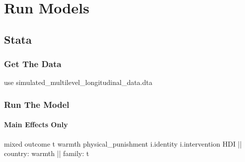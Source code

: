 \documentclass[
  letterpaper,
  DIV=11,
  numbers=noendperiod]{scrreprt}
\let\oldparagraph\paragraph
\renewcommand{\paragraph}[1]{\oldparagraph{#1}\mbox{}}
\newenvironment{Shaded}{\begin{snugshade}}{\end{snugshade}}
\newcommand{\KeywordTok}[1]{\textcolor[rgb]{0.00,0.23,0.31}{#1}}
\newcommand{\NormalTok}[1]{\textcolor[rgb]{0.00,0.23,0.31}{#1}}
\begin{document}
\section{Run Models}\label{run-models-2}

\subsection{Stata}

\subsubsection{Get The Data}\label{get-the-data-3}

\begin{Shaded}
\begin{Highlighting}[]

\KeywordTok{use}\NormalTok{ simulated\_multilevel\_longitudinal\_data.dta}
\end{Highlighting}
\end{Shaded}

\subsubsection{Run The Model}\label{run-the-model-3}

\paragraph{Main Effects Only}\label{main-effects-only}

\begin{Shaded}
\begin{Highlighting}[]
\NormalTok{mixed outcome t warmth physical\_punishment i.}\KeywordTok{identity}\NormalTok{ i.intervention HDI || country: warmth || }\KeywordTok{family}\NormalTok{: t}
\end{Highlighting}
\end{Shaded}
\end{document}
